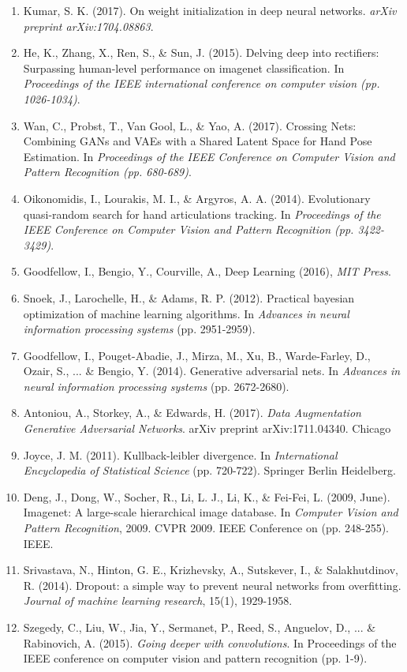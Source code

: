 \documentclass{article}
\begin{document}
{\begin{enumerate}
\item Kumar, S. K. (2017). On weight initialization in deep neural networks. \emph{arXiv preprint arXiv:1704.08863}.
\item He, K., Zhang, X., Ren, S., \& Sun, J. (2015). Delving deep into rectifiers: Surpassing human-level performance on imagenet classification. In \emph{Proceedings of the IEEE international conference on computer vision (pp. 1026-1034)}.
\item Wan, C., Probst, T., Van Gool, L., \& Yao, A. (2017). Crossing Nets: Combining GANs and VAEs with a Shared Latent Space for Hand Pose Estimation. In \emph{Proceedings of the IEEE Conference on Computer Vision and Pattern Recognition (pp. 680-689)}.
\item Oikonomidis, I., Lourakis, M. I., \& Argyros, A. A. (2014). Evolutionary quasi-random search for hand articulations tracking. In \emph{Proceedings of the IEEE Conference on Computer Vision and Pattern Recognition (pp. 3422-3429)}.
\item Goodfellow, I., Bengio, Y., Courville, A., Deep Learning (2016), \emph{MIT Press}.
\item Snoek, J., Larochelle, H., \& Adams, R. P. (2012). Practical bayesian optimization of machine learning algorithms. In \emph{Advances in neural information processing systems} (pp. 2951-2959).
\item Goodfellow, I., Pouget-Abadie, J., Mirza, M., Xu, B., Warde-Farley, D., Ozair, S., ... \& Bengio, Y. (2014). Generative adversarial nets. In \emph{Advances in neural information processing systems} (pp. 2672-2680).
\item Antoniou, A., Storkey, A., \& Edwards, H. (2017). \emph{Data Augmentation Generative Adversarial Networks}. arXiv preprint arXiv:1711.04340.
Chicago	
\item Joyce, J. M. (2011). Kullback-leibler divergence. In \emph{International Encyclopedia of Statistical Science} (pp. 720-722). Springer Berlin Heidelberg.
\item Deng, J., Dong, W., Socher, R., Li, L. J., Li, K., \& Fei-Fei, L. (2009, June). Imagenet: A large-scale hierarchical image database. In \emph{Computer Vision and Pattern Recognition}, 2009. CVPR 2009. IEEE Conference on (pp. 248-255). IEEE.
\item Srivastava, N., Hinton, G. E., Krizhevsky, A., Sutskever, I., \& Salakhutdinov, R. (2014). Dropout: a simple way to prevent neural networks from overfitting. \emph{Journal of machine learning research}, 15(1), 1929-1958.
\item Szegedy, C., Liu, W., Jia, Y., Sermanet, P., Reed, S., Anguelov, D., ... \& Rabinovich, A. (2015). \emph{Going deeper with convolutions}. In Proceedings of the IEEE conference on computer vision and pattern recognition (pp. 1-9).

\end{enumerate}}
\end{document}
